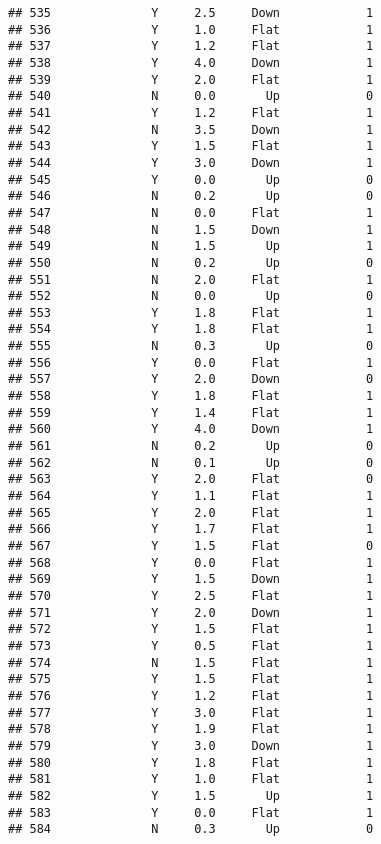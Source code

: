 \documentclass[
]{article}
\begin{document}
\begin{verbatim}
## 535              Y     2.5     Down            1
## 536              Y     1.0     Flat            1
## 537              Y     1.2     Flat            1
## 538              Y     4.0     Down            1
## 539              Y     2.0     Flat            1
## 540              N     0.0       Up            0
## 541              Y     1.2     Flat            1
## 542              N     3.5     Down            1
## 543              Y     1.5     Flat            1
## 544              Y     3.0     Down            1
## 545              Y     0.0       Up            0
## 546              N     0.2       Up            0
## 547              N     0.0     Flat            1
## 548              N     1.5     Down            1
## 549              N     1.5       Up            1
## 550              N     0.2       Up            0
## 551              N     2.0     Flat            1
## 552              N     0.0       Up            0
## 553              Y     1.8     Flat            1
## 554              Y     1.8     Flat            1
## 555              N     0.3       Up            0
## 556              Y     0.0     Flat            1
## 557              Y     2.0     Down            0
## 558              Y     1.8     Flat            1
## 559              Y     1.4     Flat            1
## 560              Y     4.0     Down            1
## 561              N     0.2       Up            0
## 562              N     0.1       Up            0
## 563              Y     2.0     Flat            0
## 564              Y     1.1     Flat            1
## 565              Y     2.0     Flat            1
## 566              Y     1.7     Flat            1
## 567              Y     1.5     Flat            0
## 568              Y     0.0     Flat            1
## 569              Y     1.5     Down            1
## 570              Y     2.5     Flat            1
## 571              Y     2.0     Down            1
## 572              Y     1.5     Flat            1
## 573              Y     0.5     Flat            1
## 574              N     1.5     Flat            1
## 575              Y     1.5     Flat            1
## 576              Y     1.2     Flat            1
## 577              Y     3.0     Flat            1
## 578              Y     1.9     Flat            1
## 579              Y     3.0     Down            1
## 580              Y     1.8     Flat            1
## 581              Y     1.0     Flat            1
## 582              Y     1.5       Up            1
## 583              Y     0.0     Flat            1
## 584              N     0.3       Up            0

\end{verbatim}
\end{document}
